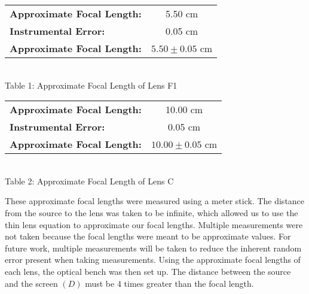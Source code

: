 \begin{center}
        \begin{tabular}{|l c|}
        \hline
        \textbf{Approximate Focal Length: } & 5.50 cm \\
        \textbf{Instrumental Error:} & 0.05 cm \\
        \textbf{Approximate Focal Length:} & $5.50\pm0.05$ cm \\ \hline        
        \end{tabular}
        \vspace{3mm}
        \\Table 1: Approximate Focal Length of Lens F1
        \vspace{5mm}\\
        \begin{tabular}{|l c|}
            \hline
            \textbf{Approximate Focal Length: } & 10.00 cm \\
            \textbf{Instrumental Error:} & 0.05 cm \\
            \textbf{Approximate Focal Length:} & $10.00\pm0.05$ cm \\ \hline        
        \end{tabular}
        \vspace{3mm}
        \\Table 2: Approximate Focal Length of Lens C\\
    \end{center}
These approximate focal lengths were measured using a meter stick. 
The distance from the source to the lens was taken to be infinite, which allowed us to use the thin lens equation to approximate  our focal lengths. 
Multiple measurements were not taken because the focal lengths were meant to be approximate values.
For future work, multiple measurements will be taken to reduce the inherent random error present when taking measurements.
Using the approximate focal lengths of each lens, the optical bench was then set up. 
The distance between the source and the screen $(D)$ must be 4 times greater than the focal length.\\
